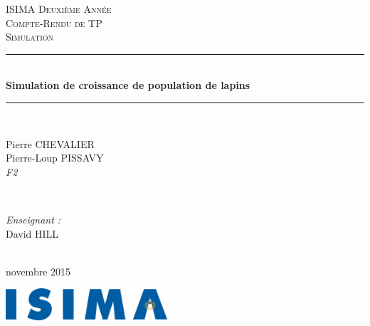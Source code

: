\begin{titlepage}
  \newcommand{\HRule}{\rule{\linewidth}{0.5mm}}
  \center
  \null{}
  \vspace{3cm}

  \textsc{\LARGE ISIMA Deuxième Année}\\[1.5cm]
  \textsc{\Large Compte-Rendu de TP}\\[0.5cm]
  \textsc{\LARGE Simulation}\\[1.5cm]
  \HRule \\[0.4cm]
  { \huge \bfseries  Simulation de croissance de population de lapins}\\
  \HRule \\[1.5cm]

  \begin{minipage}{0.4\textwidth}
    \begin{flushleft} \large
      Pierre CHEVALIER\\
      Pierre-Loup PISSAVY\\
      {\normalsize\textit{F2}}
    \end{flushleft}
  \end{minipage}
  ~
  \begin{minipage}{0.4\textwidth}
    \begin{flushright} \large
      \emph{Enseignant :} \\
      David HILL
    \end{flushright}
  \end{minipage}\\[4cm]

  {\large novembre 2015}\\[3cm]

  \vfill

  \includegraphics[width=6cm]{settings/ISIMA_logo.pdf}\\[1cm]
\end{titlepage}
